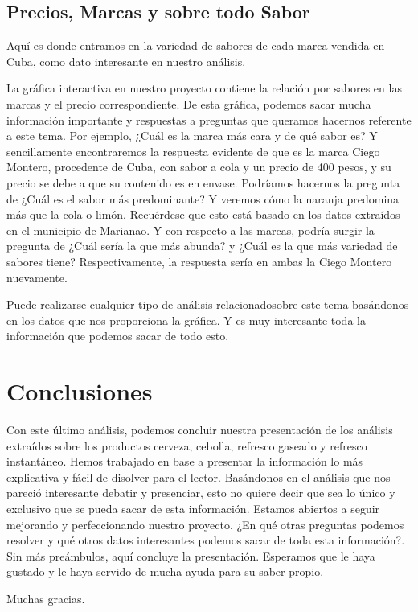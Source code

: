 \documentclass[a4paper,12pt]{article}
\begin{document}
\subsection{Precios, Marcas y sobre todo Sabor}
Aquí es donde entramos en la variedad de sabores de cada marca vendida en Cuba, como dato interesante en nuestro análisis.

La gráfica interactiva en nuestro proyecto contiene la relación por sabores en las marcas y el precio correspondiente. 
De esta gráfica, podemos sacar mucha información importante y respuestas a preguntas que queramos hacernos referente a este tema. 
Por ejemplo, ¿Cuál es la marca más cara y de qué sabor es? Y sencillamente encontraremos la respuesta evidente de que es la marca Ciego Montero, procedente de Cuba, con sabor a cola y un precio de 400 pesos, y su precio se debe a que su contenido es en envase. 
Podríamos hacernos la pregunta de ¿Cuál es el sabor más predominante? Y veremos cómo la naranja predomina más que la cola o limón. 
Recuérdese que esto está basado en los datos extraídos en el municipio de Marianao. Y con respecto a las marcas, podría surgir la pregunta de ¿Cuál sería la que más abunda? y ¿Cuál es la que más variedad de sabores tiene? 
Respectivamente, la respuesta sería en ambas la Ciego Montero nuevamente.

Puede realizarse cualquier tipo de análisis relacionadosobre este tema basándonos en los datos que nos proporciona la gráfica. 
Y es muy interesante toda la información que podemos sacar de todo esto.

\section{Conclusiones}
Con este último análisis, podemos concluir nuestra presentación de los análisis extraídos sobre los productos cerveza, cebolla, refresco gaseado y refresco instantáneo. 
Hemos trabajado en base a presentar la información lo más explicativa y fácil de disolver para el lector. Basándonos en el análisis que nos pareció interesante debatir y presenciar, esto no quiere decir que sea lo único y exclusivo que se pueda sacar de esta información. 
Estamos abiertos a seguir mejorando y perfeccionando nuestro proyecto. ¿En qué otras preguntas podemos resolver y qué otros datos interesantes podemos sacar de toda esta información?. 
Sin más preámbulos, aquí concluye la presentación. Esperamos que le haya gustado y le haya servido de mucha ayuda para su saber propio.

Muchas gracias.


\newpage
\tableofcontents

\newpage

\end{document}
